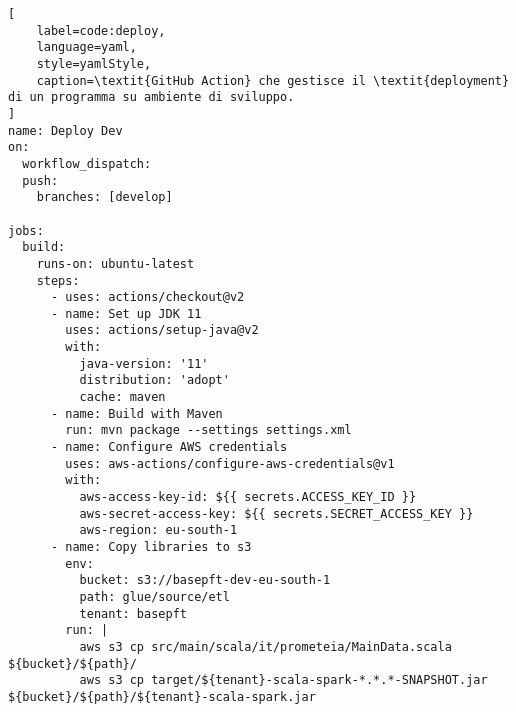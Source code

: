\begin{lstlisting}[
    label=code:deploy,
    language=yaml,
    style=yamlStyle,
    caption=\textit{GitHub Action} che gestisce il \textit{deployment} di un programma su ambiente di sviluppo.
]
name: Deploy Dev
on:
  workflow_dispatch:
  push:
    branches: [develop]

jobs:
  build:
    runs-on: ubuntu-latest
    steps:
      - uses: actions/checkout@v2
      - name: Set up JDK 11
        uses: actions/setup-java@v2
        with:
          java-version: '11'
          distribution: 'adopt'
          cache: maven
      - name: Build with Maven
        run: mvn package --settings settings.xml
      - name: Configure AWS credentials
        uses: aws-actions/configure-aws-credentials@v1
        with:
          aws-access-key-id: ${{ secrets.ACCESS_KEY_ID }}
          aws-secret-access-key: ${{ secrets.SECRET_ACCESS_KEY }}
          aws-region: eu-south-1
      - name: Copy libraries to s3
        env:
          bucket: s3://basepft-dev-eu-south-1
          path: glue/source/etl
          tenant: basepft
        run: |
          aws s3 cp src/main/scala/it/prometeia/MainData.scala ${bucket}/${path}/
          aws s3 cp target/${tenant}-scala-spark-*.*.*-SNAPSHOT.jar ${bucket}/${path}/${tenant}-scala-spark.jar
\end{lstlisting}